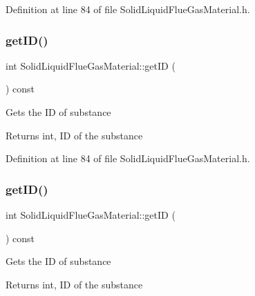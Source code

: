 Definition at line 84 of file Solid\+Liquid\+Flue\+Gas\+Material.\+h.

\mbox{\label{class_solid_liquid_flue_gas_material_afb124b546137da7ba99e31616198e0c8}} 
\subsubsection{\texorpdfstring{get\+I\+D()}{getID()}\hspace{0.1cm}{\footnotesize\ttfamily [2/3]}}
{\footnotesize\ttfamily int Solid\+Liquid\+Flue\+Gas\+Material\+::get\+ID (\begin{DoxyParamCaption}{ }\end{DoxyParamCaption}) const\hspace{0.3cm}{\ttfamily [inline]}}

Gets the ID of substance \begin{DoxyReturn}{Returns}
int, ID of the substance 
\end{DoxyReturn}


Definition at line 84 of file Solid\+Liquid\+Flue\+Gas\+Material.\+h.

\mbox{\label{class_solid_liquid_flue_gas_material_afb124b546137da7ba99e31616198e0c8}} 
\subsubsection{\texorpdfstring{get\+I\+D()}{getID()}\hspace{0.1cm}{\footnotesize\ttfamily [3/3]}}
{\footnotesize\ttfamily int Solid\+Liquid\+Flue\+Gas\+Material\+::get\+ID (\begin{DoxyParamCaption}{ }\end{DoxyParamCaption}) const\hspace{0.3cm}{\ttfamily [inline]}}

Gets the ID of substance \begin{DoxyReturn}{Returns}
int, ID of the substance 
\end{DoxyReturn}


